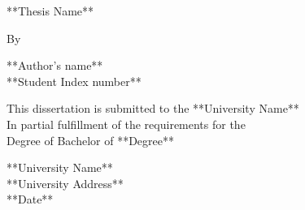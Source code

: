 \begin{titlepage}
\begin{center}

**Thesis Name**

\vspace{12pt}

By

\vspace{12pt}

**Author's name** \\
**Student Index number**

\vspace{140pt}


This dissertation is submitted to the **University Name** \\
In partial fulfillment of the requirements for the \\
Degree of Bachelor of **Degree**


\vspace{140pt}


**University Name** \\
**University Address** \\

**Date**


\end{center}
\end{titlepage}